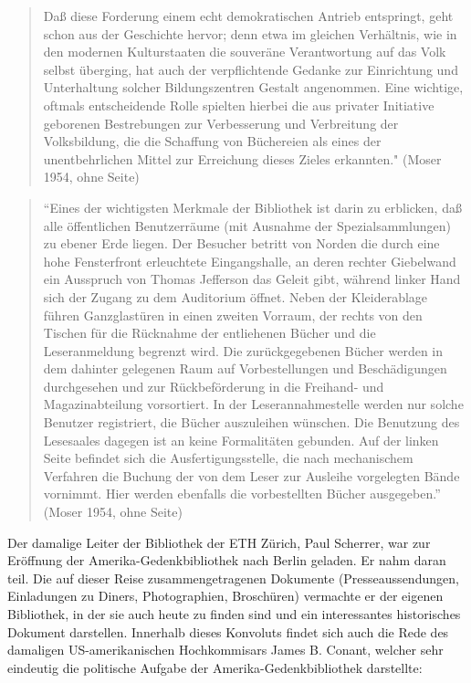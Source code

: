 \documentclass[a4paper,
fontsize=11pt,
oneside,
numbers=noperiodatend,
parskip=half-,
bibliography=totoc,
final
]{scrartcl}
\begin{document}
\begin{quote}
Daß diese Forderung einem echt demokratischen Antrieb entspringt, geht
schon aus der Geschichte hervor; denn etwa im gleichen Verhältnis, wie
in den modernen Kulturstaaten die souveräne Verantwortung auf das Volk
selbst überging, hat auch der verpflichtende Gedanke zur Einrichtung und
Unterhaltung solcher Bildungszentren Gestalt angenommen. Eine wichtige,
oftmals entscheidende Rolle spielten hierbei die aus privater Initiative
geborenen Bestrebungen zur Verbesserung und Verbreitung der
Volksbildung, die die Schaffung von Büchereien als eines der
unentbehrlichen Mittel zur Erreichung dieses Zieles erkannten." (Moser
1954, ohne Seite)
\end{quote}

\begin{quote}
\enquote{Eines der wichtigsten Merkmale der Bibliothek ist darin zu
erblicken, daß alle öf\-fent\-lichen Benutzerräume (mit Ausnahme der
Spezialsammlungen) zu ebener Erde liegen. Der Besucher betritt von
Norden die durch eine hohe Fensterfront erleuchtete Eingangshalle, an
deren rechter Giebelwand ein Ausspruch von Thomas Jefferson das Geleit
gibt, während linker Hand sich der Zugang zu dem Auditorium öffnet.
Neben der Kleiderablage führen Ganzglastüren in einen zweiten Vorraum,
der rechts von den Tischen für die Rücknahme der entliehenen Bücher und
die Leseranmeldung begrenzt wird. Die zurückgegebenen Bücher werden in
dem dahinter gelegenen Raum auf Vorbestellungen und Beschädigungen
durchgesehen und zur Rückbeförderung in die Freihand- und
Magazinabteilung vorsortiert. In der Leserannahmestelle werden nur
solche Benutzer registriert, die Bücher auszuleihen wünschen. Die
Benutzung des Lesesaales dagegen ist an keine Formalitäten gebunden. Auf
der linken Seite befindet sich die Ausfertigungsstelle, die nach
mechanischem Verfahren die Buchung der von dem Leser zur Ausleihe
vorgelegten Bände vornimmt. Hier werden ebenfalls die vorbestellten
Bücher ausgegeben.} (Moser 1954, ohne Seite)
\end{quote}

Der damalige Leiter der Bibliothek der ETH Zürich, Paul Scherrer, war
zur Eröffnung der A\-me\-rika-Gedenkbibliothek nach Berlin geladen. Er nahm
daran teil. Die auf dieser Reise zusammengetragenen Dokumente
(Presseaussendungen, Einladungen zu Diners, Photographien, Broschüren)
vermachte er der eigenen Bibliothek, in der sie auch heute zu finden
sind und ein interessantes historisches Dokument darstellen. Innerhalb
dieses Konvoluts findet sich auch die Rede des damaligen
US-amerikanischen Hochkommisars James B. Conant, welcher sehr eindeutig
die politische Aufgabe der Amerika-Gedenkbibliothek darstellte:
\end{document}

